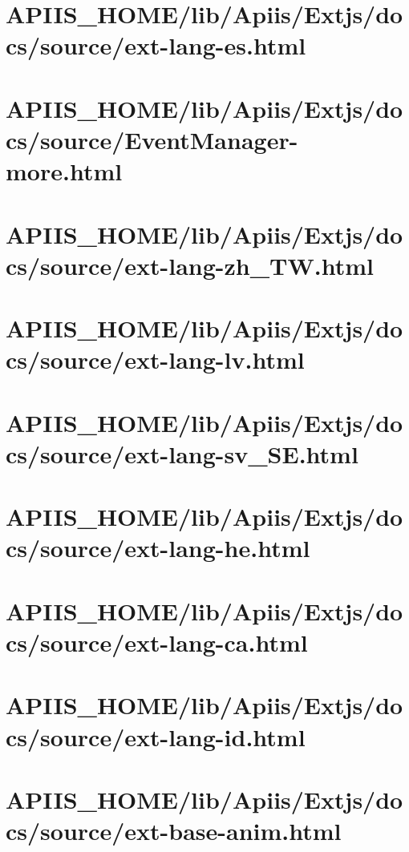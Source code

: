 \section{APIIS\_HOME/lib/Apiis/Extjs/docs/source/ext-lang-es.html} 
\section{APIIS\_HOME/lib/Apiis/Extjs/docs/source/EventManager-more.html} 
\section{APIIS\_HOME/lib/Apiis/Extjs/docs/source/ext-lang-zh\_TW.html} 
\section{APIIS\_HOME/lib/Apiis/Extjs/docs/source/ext-lang-lv.html} 
\section{APIIS\_HOME/lib/Apiis/Extjs/docs/source/ext-lang-sv\_SE.html} 
\section{APIIS\_HOME/lib/Apiis/Extjs/docs/source/ext-lang-he.html} 
\section{APIIS\_HOME/lib/Apiis/Extjs/docs/source/ext-lang-ca.html} 
\section{APIIS\_HOME/lib/Apiis/Extjs/docs/source/ext-lang-id.html} 
\section{APIIS\_HOME/lib/Apiis/Extjs/docs/source/ext-base-anim.html} 
